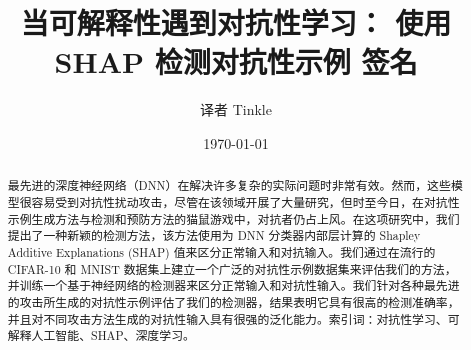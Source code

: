 \documentclass[12pt, a4paper]{ctexart} %
\title{当可解释性遇到对抗性学习：
使用 SHAP 检测对抗性示例
签名}
\author{译者    Tinkle}
\date{\today}
\begin{document}
\maketitle{}
\begin{abstract}
    最先进的深度神经网络（DNN）在解决许多复杂的实际问题时非常有效。然而，这些模型很容易受到对抗性扰动攻击，尽管在该领域开展了大量研究，但时至今日，在对抗性示例生成方法与检测和预防方法的猫鼠游戏中，对抗者仍占上风。在这项研究中，我们提出了一种新颖的检测方法，该方法使用为 DNN 分类器内部层计算的 Shapley Additive Explanations (SHAP) 值来区分正常输入和对抗输入。我们通过在流行的 CIFAR-10 和 MNIST 数据集上建立一个广泛的对抗性示例数据集来评估我们的方法，并训练一个基于神经网络的检测器来区分正常输入和对抗性输入。我们针对各种最先进的攻击所生成的对抗性示例评估了我们的检测器，结果表明它具有很高的检测准确率，并且对不同攻击方法生成的对抗性输入具有很强的泛化能力。索引词：对抗性学习、可解释人工智能、SHAP、深度学习。
\end{abstract}

\end{document}
